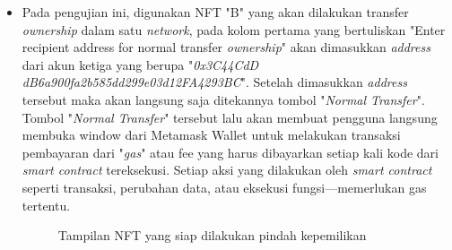 \begin{itemize}
  \item Pada pengujian ini, digunakan NFT "B" yang akan dilakukan transfer \emph{ownership} dalam satu \emph{network}, pada kolom pertama yang bertuliskan "Enter recipient address for normal transfer \emph{ownership}" akan dimasukkan \emph{address} dari akun ketiga yang berupa "\emph{0x3C44CdD dB6a900fa2b585dd299e03d12FA4293BC}". Setelah dimasukkan \emph{address} tersebut maka akan langsung saja ditekannya tombol "\emph{Normal Transfer}". Tombol "\emph{Normal Transfer}" tersebut lalu akan membuat pengguna langsung membuka window dari Metamask Wallet untuk melakukan transaksi pembayaran dari "\emph{gas}" atau fee yang harus dibayarkan setiap kali kode dari \emph{smart contract} tereksekusi. Setiap aksi yang dilakukan oleh \emph{smart contract} seperti transaksi, perubahan data, atau eksekusi fungsi—memerlukan gas tertentu.
  
  \begin{figure} [H] \centering
  \caption{Tampilan NFT yang siap dilakukan pindah kepemilikan}
  \label{fig:nft_b}
  \end{figure}
  

\end{itemize}
